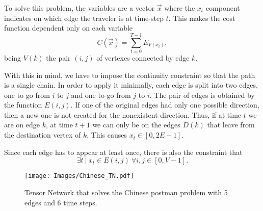 To solve this problem, the variables are a vector $\vec{x}$ where the $x_t$ component indicates on which edge the traveler is at time-step $t$. This makes the cost function dependent only on each variable
\begin{equation}
    C(\vec{x})=\sum_{t=0}^{T-1}E_{V({x_t})}, 
\end{equation}
being $V(k)$ the pair $(i,j)$ of vertexes connected by edge $k$. 

With this in mind, we have to impose the continuity constraint so that the path is a single chain. In order to apply it minimally, each edge is split into two edges, one to go from $i$ to $j$ and one to go from $j$ to $i$. The pair of edges is obtained by the function $E(i,j)$. If one of the original edges had only one possible direction, then a new one is not created for the nonexistent direction. Thus, if at time $t$ we are on edge $k$, at time $t+1$ we can only be on the edges $D(k)$ that leave from the destination vertex of $k$. This causes $x_t\in [0,2E-1]$.

Since each edge has to appear at least once, there is also the constraint that
\begin{equation}
    \exists t\ |\ x_t \in E(i,j)\ \forall i,j \in [0,V-1].
\end{equation}

\begin{figure}[h]
    \centering
    \texttt{[image: Images/Chinese\_TN.pdf]}
    \caption{Tensor Network that solves the Chinese postman problem with 5 edges and 6 time steps.}
    \label{fig: Chinese TN}
\end{figure}

